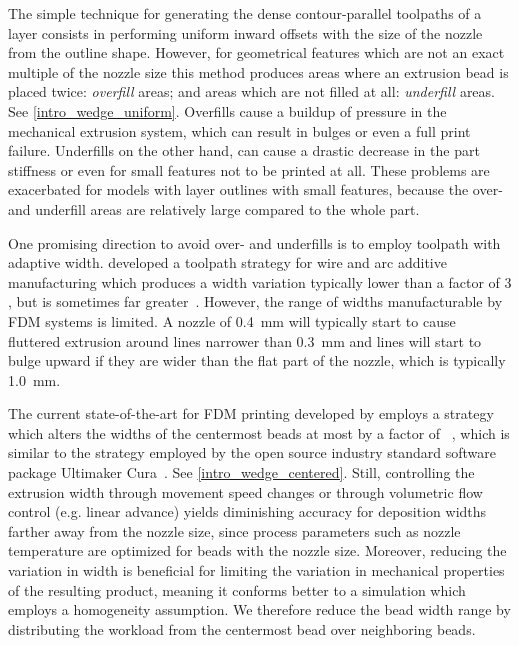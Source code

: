 The simple technique for generating the dense contour-parallel toolpaths of a layer consists in performing uniform inward offsets with the size of the nozzle from the outline shape.
However, for geometrical features which are not an exact multiple of the nozzle size this method produces areas where an extrusion bead is placed twice: \emph{overfill} areas; and areas which are not filled at all: \emph{underfill} areas.
See \cref{intro_wedge_uniform}.
Overfills cause a buildup of pressure in the mechanical extrusion system, which can result in bulges or even a full print failure.
Underfills on the other hand, can cause a drastic decrease in the part stiffness or even for small features not to be printed at all.
These problems are exacerbated for models with layer outlines with small features, because the over- and underfill areas are relatively large compared to the whole part.

One promising direction to avoid over- and underfills is to employ toolpath with adaptive width.
\citeauthor{Ding2016a} developed a toolpath strategy for wire and arc additive manufacturing which produces a width variation typically lower than a factor of $3$, but is sometimes far greater~\cite{Ding2016a,Xiong2019}.
However, the range of widths manufacturable by FDM systems is limited.
A nozzle of \SI{0.4}{\milli\meter} will typically start to cause fluttered extrusion around lines narrower than \SI{0.3}{\milli\meter} and lines will start to bulge upward if they are wider than the flat part of the nozzle, which is typically \SI{1.0}{\milli\meter}.

The current state-of-the-art for FDM printing developed by \citeauthor{Jin2017JMS} employs a strategy which alters the widths of the centermost beads at most by a factor of ~\cite{Jin2017JMS},
which is similar to the strategy employed by the open source industry standard software package Ultimaker Cura~\cite{cura}.
See \cref{intro_wedge_centered}.
Still, controlling the extrusion width through movement speed changes or through volumetric flow control (e.g. linear advance) yields diminishing accuracy for deposition widths farther away from the nozzle size,
since process parameters such as nozzle temperature are optimized for beads with the nozzle size.
Moreover, reducing the variation in width is beneficial for limiting the variation in mechanical properties of the resulting product, meaning it conforms better to a simulation which employs a homogeneity assumption.
{We therefore reduce the bead width range by distributing the workload from the centermost bead over neighboring beads.}

